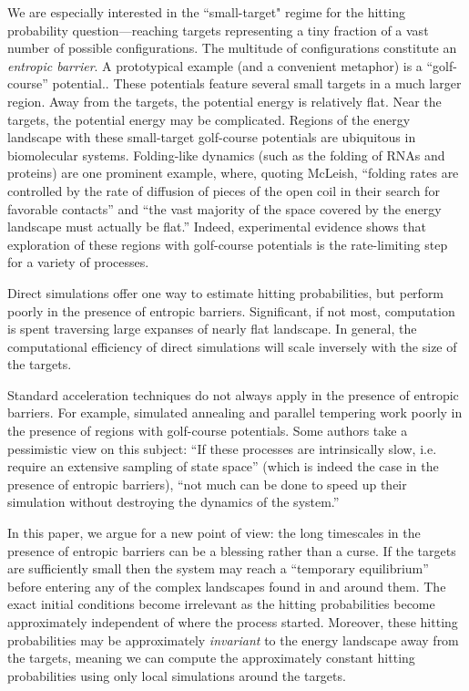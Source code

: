 \documentclass[nofootinbib,english, aip, jcp, priprint, graphicx,floatfix]{revtex4-1}
\theoremstyle{plain}
\theoremstyle{definition}
\theoremstyle{plain}
\begin{document}
We are especially interested in the ``small-target" regime for the hitting probability question---reaching targets representing a tiny fraction of a vast number of possible configurations. The multitude of configurations constitute an \emph{entropic barrier}. A prototypical example (and a convenient metaphor) is a  ``golf-course'' potential.\cite{bicout2000entropic, Baum1986-we, Wille1987-tf}. These potentials feature several small targets in a much larger region. Away from the targets, the potential energy is relatively flat.  Near the targets, the potential energy may be complicated. Regions of the energy landscape with these small-target golf-course potentials are ubiquitous in biomolecular systems. Folding-like dynamics (such as the folding of RNAs and proteins) are one prominent example, where, quoting 
McLeish\cite{McLeish2005-dq}, ``folding rates are controlled by the rate of diffusion of pieces of the open coil in their search for favorable contacts'' and ``the vast majority of the space covered by the energy landscape must actually be flat.'' Indeed, experimental evidence shows that exploration of these regions with golf-course potentials is the rate-limiting step for a variety of processes.\cite{Teschner1987-qs, Jacob1999-bs, Goldberg1999-mv, Plaxco1998-iv}

Direct simulations offer one way to estimate hitting probabilities, but perform poorly in the presence of entropic barriers. 
Significant, if not most, computation is spent traversing large expanses of nearly flat landscape. In general, the computational efficiency of direct simulations will scale inversely with the size of the targets.

Standard acceleration techniques do not always apply in the presence of entropic barriers.  For example, simulated annealing and parallel tempering work poorly in the presence of regions with golf-course potentials.\cite{Baum1986-we, Wille1987-tf, Machta2009-gh} Some authors take a pessimistic view on this subject: ``If these processes are intrinsically slow, i.e. require an extensive sampling of state space'' (which is indeed the case in the presence of entropic barriers), ``not much can be done to speed up their simulation without destroying the dynamics of the system.''\cite{Christen2008-ge}

In this paper, we argue for a new point of view: the long timescales in the presence of entropic barriers can be a blessing rather than a curse.  If the targets are sufficiently small then the system may reach a ``temporary equilibrium'' before entering any of the complex landscapes found in and around them. The exact initial conditions become irrelevant as the hitting probabilities become approximately independent of where the process started.  Moreover, these hitting probabilities may be approximately \emph{invariant} to the energy landscape away from the targets, meaning we can compute the approximately constant hitting probabilities using only local simulations around the targets.
\end{document}
